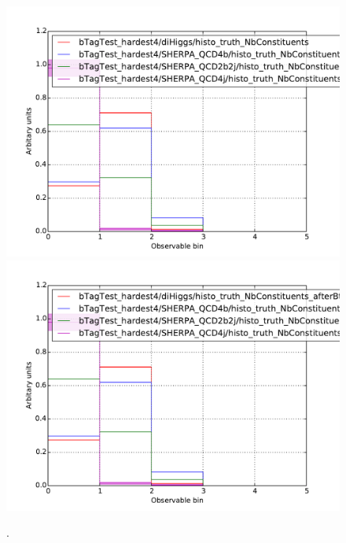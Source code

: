 \documentclass[12pt]{article}
\begin{document}
\begin{figure}[h!]
\begin{center}
\includegraphics[width=\textwidth]{plots/histo_NbConstits_4hardest.pdf}
\includegraphics[width=\textwidth]{plots/histo_NbConstits_4hardest_afterBtag.pdf}
\caption{.}
\end{center}
\end{figure}
\end{document}
